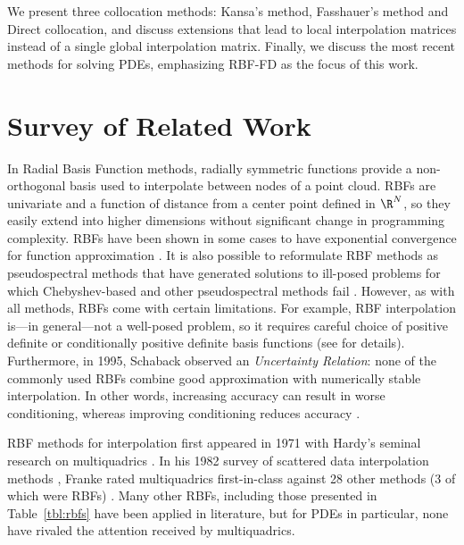 \documentclass{report}
\begin{document}
{%
We present three collocation methods: Kansa's method, Fasshauer's method and Direct collocation, and discuss extensions that lead to local interpolation matrices instead of a single global interpolation matrix. Finally, we discuss the most recent methods for solving PDEs, emphasizing RBF-FD as the focus of this work. 

\section{Survey of Related Work}


In Radial Basis Function methods, radially symmetric functions provide a non-orthogonal basis used to interpolate between 
nodes of a point cloud. RBFs are univariate and a function of distance from a center point defined in $\R^N$, so 
they easily extend into higher dimensions without significant change in programming complexity. RBFs have been shown in 
some cases to have exponential convergence for function approximation \cite{Fasshauer2007}. It is also possible to 
reformulate RBF methods as pseudospectral methods that have 
generated solutions to ill-posed problems for which Chebyshev-based and other pseudospectral methods 
fail \cite{Fasshauer2006}. However, as with all methods, RBFs come with certain limitations. For example, RBF interpolation is---in general---not a well-posed problem, so it requires careful choice of positive definite or conditionally positive definite basis functions (see \cite{Iske2004, Fasshauer2007} for details). Furthermore, in 1995,  
Schaback \cite{Schaback1995} observed an \emph{Uncertainty Relation}: none of the commonly used RBFs combine 
good approximation with numerically stable interpolation. In other words, increasing accuracy can result in worse conditioning, 
whereas improving conditioning reduces accuracy \cite{Schaback1995, Iske2004}. 




RBF methods for interpolation first appeared in 1971 with Hardy's seminal research on multiquadrics
\cite{Hardy1971}. In his 1982 survey of scattered data interpolation methods \cite{Franke1982}, Franke rated multiquadrics first-in-class against 28 other methods (3 of which were RBFs) \cite{Franke1982}. Many other RBFs, 
including those presented in Table~\ref{tbl:rbfs} have been applied in literature, but for PDEs in particular, none have rivaled the 
attention received by multiquadrics. 


}
\end{document}
